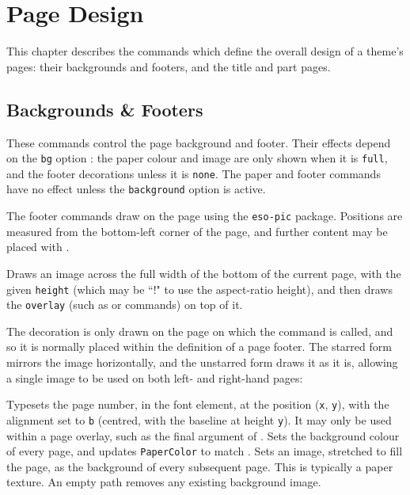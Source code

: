 \chapter{Page Design}\label{C:PageDesign}

	This chapter describes the commands which define the overall design of a theme's pages: their backgrounds and footers, and the title and part pages.

	\section{Backgrounds \& Footers}\label{S:PageAppearance}

		These commands control the page background and footer. Their effects depend on the \texttt{bg} option : the paper colour and image are only shown when it is \texttt{full}, and the footer decorations unless it is \texttt{none}. The paper and footer commands have no effect unless the \texttt{background} option is active.

		The footer commands draw on the page using the \texttt{eso-pic} package. Positions are measured from the bottom-left corner of the page, and further content may be placed with .

		{
			Draws an image across the full width of the bottom of the current page, with the given \texttt{height} (which may be ``!" to use the aspect-ratio height), and then draws the \texttt{overlay} (such as  or  commands) on top of it.

			The decoration is only drawn on the page on which the command is called, and so it is normally placed within the definition of a page footer. The starred form mirrors the image horizontally, and the unstarred form draws it as it is, allowing a single image to be used on both left- and right-hand pages:

		}
		{
			Typesets the page number, in the  font element, at the position (\texttt{x}, \texttt{y}), with the alignment set to \texttt{b} (centred, with the baseline at height \texttt{y}). It may only be used within a page overlay, such as the final argument of .
		}
		{
			Sets the background colour of every page, and updates \texttt{PaperColor} to match .
		}
		{
			Sets an image, stretched to fill the page, as the background of every subsequent page. This is typically a paper texture. An empty path removes any existing background image.
		}

